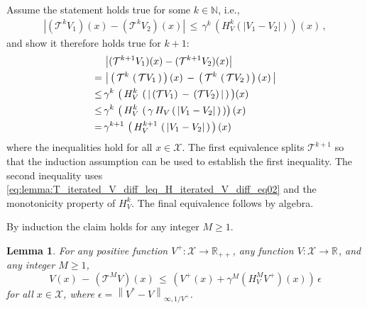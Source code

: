 \documentclass[journal]{IEEEtran}
\newtheorem{lemma}[theorem]{Lemma}
\newcommand{\bcol}[1]{{\color{black}#1}}
\newcommand{\kcol}[1]{{\color{black}#1}}
\newcommand{\mbb}{\mathbb}
\newcommand{\mcal}{\mathcal}
\newcommand{\rdim}[1]{\mathbb{R}^{#1}}
\begin{document}
\begin{IEEEproof}
	Assume the statement holds true for some $k\in\mbb{N}$, i.e.,
	\begin{equation} \nonumber
		\begin{aligned}
			\left| \left( \mcal{T}^k V_1 \right)(x) - \left( \mcal{T}^k V_2 \right)(x) \right| \,\leq\, \gamma^k \, \left( H_V^k  \left( \left| V_1 - V_2 \right| \right) \right)(x)
				\,,
		\end{aligned}
	\end{equation}
	and show it therefore holds true for $k+1$:
	\begin{equation} \nonumber
		\begin{aligned}
			&\,\left| (\mcal{T}^{k+1} V_1)(x) - (\mcal{T}^{k+1} V_2)(x) \right|
			\\
			=&\,\left|\, \left(\, \bcol{\mcal{T}^{k}} \, \left(\, \bcol{\mcal{T}} V_1 \,\right) \,\right)(x) \,-\, \left(\, \bcol{\mcal{T}^{k}} \, \left(\, \bcol{\mcal{T}} V_2 \,\right) \,\right)(x) \,\right|
			\\
			\kcol{\leq}&\, \bcol{ \gamma^k \, \left(\, H_V^k \, \left(\, \left|\,  \kcol{ \left(\mcal{T} V_1\right) \,-\, \left( \mcal{T} V_2 \right) } \,\right| \, \right) \, \right) } (x)
			\\
			\kcol{\leq}&\, \gamma^{k} \,  \left(\, H_V^{k} \, \left(\, \bcol{ \gamma \, H_V \left(\, \left| V_1 - V_2 \right| \,\right) } \,\right) \right)(x)\,
			\\
			=&\, \bcol{\gamma^{k+1}} \,  \left(\, \bcol{H_V^{k+1}} \, \left(\, \left| V_1 - V_2 \right| \,\right) \,\right)(x)
		\end{aligned}
	\end{equation}
	where the inequalities hold for all $x \in \mcal{X}$. The first equivalence splits $\mcal{T}^{k+1}$ so that the induction assumption can be used to establish the first inequality. The second inequality uses \eqref{eq:lemma:T_iterated_V_diff_leq_H_iterated_V_diff_eq02} and the monotonicity property of $H_V^k$. The final equivalence follows by algebra.
	
	By induction the claim holds for any integer $M \geq 1$.
\end{IEEEproof}



\vspace{0.2cm}


\begin{lemma} \label{lemma:T_iterated_V_geq_V_minusLyap}
	For any positive function $V^+:\mcal{X} \rightarrow \rdim{}_{++}$, any function $V:\mcal{X} \rightarrow \rdim{}$, and any integer $M \geq 1$,
	\begin{equation} \nonumber
			V(x) \,-\, (\mcal{T}^M V)(x)
				\,\leq\,
				\left( V^+(x) + \gamma^M (H_V^M V^+)(x) \right) \, \epsilon
	\end{equation}
	for all $x \in \mcal{X}$, where $\epsilon = \left\| V^\ast - V \right\|_{\infty,1/V^+}$.
\end{lemma}
\end{document}
